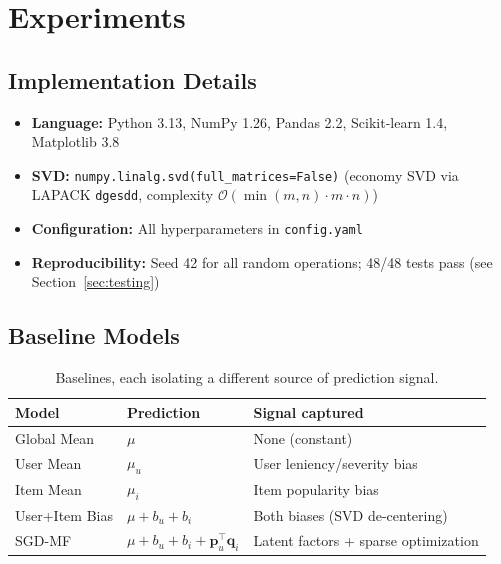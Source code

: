 \documentclass[12pt, a4paper]{article}
\newcommand{\file}[1]{\texttt{\small #1}}
\begin{document}
\section{Experiments}
\label{sec:exp}

\subsection{Implementation Details}

\begin{itemize}
  \item \textbf{Language:} Python 3.13, NumPy 1.26, Pandas 2.2,
        Scikit-learn 1.4, Matplotlib 3.8
  \item \textbf{SVD:} \texttt{numpy.linalg.svd(full\_matrices=False)}
        (economy SVD via LAPACK \texttt{dgesdd}, complexity
        $\mathcal{O}(\min(m,n)\cdot m\cdot n)$)
  \item \textbf{Configuration:} All hyperparameters in \file{config.yaml}
  \item \textbf{Reproducibility:} Seed 42 for all random operations;
        48/48 tests pass (see Section~\ref{sec:testing})
\end{itemize}

\subsection{Baseline Models}

\begin{table}[h!]
\centering
\caption{Baselines, each isolating a different source of prediction signal.}
\begin{tabular}{llp{5.5cm}}
\toprule
\textbf{Model} & \textbf{Prediction} & \textbf{Signal captured} \\
\midrule
Global Mean    & $\mu$                      & None (constant) \\
User Mean      & $\mu_u$                    & User leniency/severity bias \\
Item Mean      & $\mu_i$                    & Item popularity bias \\
User+Item Bias & $\mu + b_u + b_i$          & Both biases (SVD de-centering) \\
SGD-MF         & $\mu+b_u+b_i+\mathbf{p}_u^\top\mathbf{q}_i$ & Latent factors + sparse optimization \\
\bottomrule
\end{tabular}
\end{table}
\end{document}
